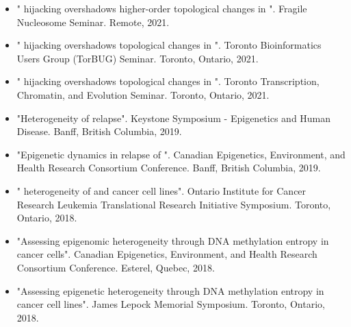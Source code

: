 \begin{itemize}
  \item " hijacking overshadows higher-order topological changes in ". Fragile Nucleosome Seminar. Remote, 2021.
  \item " hijacking overshadows topological changes in ". Toronto Bioinformatics Users Group (TorBUG) Seminar. Toronto, Ontario, 2021.
  \item " hijacking overshadows topological changes in ". Toronto Transcription, Chromatin, and Evolution Seminar. Toronto, Ontario, 2021.
  \item "Heterogeneity of   relapse". Keystone Symposium - Epigenetics and Human Disease. Banff, British Columbia, 2019.
  \item "Epigenetic dynamics in relapse of ". Canadian Epigenetics, Environment, and Health Research Consortium Conference. Banff, British Columbia, 2019.
  \item " heterogeneity of  and cancer cell lines". Ontario Institute for Cancer Research Leukemia Translational Research Initiative Symposium. Toronto, Ontario, 2018.
  \item "Assessing epigenomic heterogeneity through DNA methylation entropy in cancer cells". Canadian Epigenetics, Environment, and Health Research Consortium Conference. Esterel, Quebec, 2018.
  \item "Assessing epigenetic heterogeneity through DNA methylation entropy in cancer cell lines". James Lepock Memorial Symposium. Toronto, Ontario, 2018.
\end{itemize}
